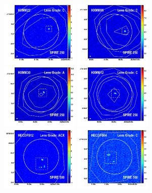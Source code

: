 \documentclass[iop]{emulateapj}
\begin{document}
\begin{figure}[!tbp] 
    \begin{centering}
\includegraphics[width=0.331\textwidth]{../Figures/overlays/HXMM22_870_250.pdf}
\includegraphics[width=0.331\textwidth]{../Figures/overlays/HXMM05_870_250.pdf}
\includegraphics[width=0.331\textwidth]{../Figures/overlays/HXMM30_870_250.pdf}
\includegraphics[width=0.331\textwidth]{../Figures/overlays/HXMM12_870_250.pdf}
\includegraphics[width=0.331\textwidth]{../Figures/overlays/HECDFS12_870_500.pdf}
\includegraphics[width=0.331\textwidth]{../Figures/overlays/HECDFS04_870_500.pdf}

\end{centering}
\end{figure}
\end{document}
